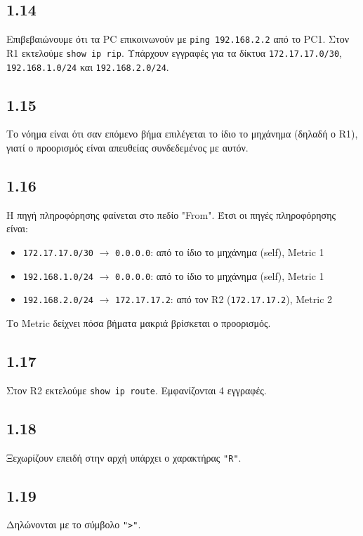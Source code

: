 \documentclass[a4paper, 12pt]{article}
\begin{document}
	\subsection*{1.14}
		Επιβεβαιώνουμε ότι τα PC επικοινωνούν με \verb|ping 192.168.2.2| από το PC1. Στον R1 εκτελούμε \verb|show ip rip|. Υπάρχουν εγγραφές για τα δίκτυα \verb|172.17.17.0/30|, \verb|192.168.1.0/24| και  \verb|192.168.2.0/24|.

	\subsection*{1.15}
		Το νόημα είναι ότι σαν επόμενο βήμα επιλέγεται το ίδιο το μηχάνημα (δηλαδή ο R1), γιατί ο προορισμός είναι απευθείας συνδεδεμένος με αυτόν.		

	\subsection*{1.16}
		Η πηγή πληροφόρησης φαίνεται στο πεδίο "From". Έτσι οι πηγές πληροφόρησης είναι:
		
		\begin{itemize}
			\item \verb|172.17.17.0/30| $\rightarrow$ \verb|0.0.0.0|: από το ίδιο το μηχάνημα (self), Metric 1
			\item \verb|192.168.1.0/24| $\rightarrow$ \verb|0.0.0.0|: από το ίδιο το μηχάνημα (self), Metric 1
			\item \verb|192.168.2.0/24| $\rightarrow$ \verb|172.17.17.2|: από τον R2 (\verb|172.17.17.2|), Metric 2
		\end{itemize}
		
		Το Metric δείχνει πόσα βήματα μακριά βρίσκεται ο προορισμός.

	\subsection*{1.17}
		Στον R2 εκτελούμε \verb|show ip route|. Εμφανίζονται 4 εγγραφές.

	\subsection*{1.18}
		Ξεχωρίζουν επειδή στην αρχή υπάρχει ο χαρακτήρας \verb|"R"|.

	\subsection*{1.19}
		Δηλώνονται με το σύμβολο \verb|">"|.
\end{document}
